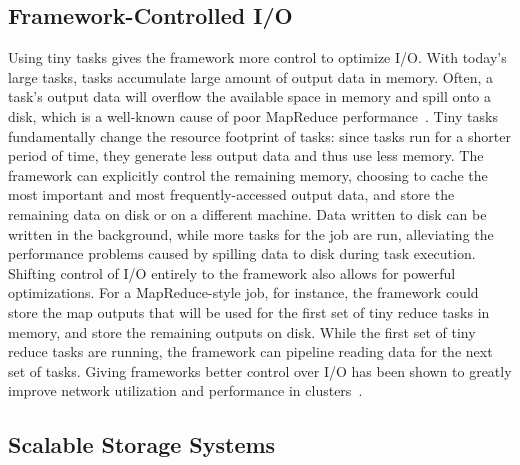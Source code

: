 \subsection{Framework-Controlled I/O}
\label{sec:pipeline}

Using tiny tasks gives the framework more control to optimize I/O.
With
today's large tasks, tasks accumulate large amount of output data in memory.
Often, a task's output data will overflow the available space in memory
and spill onto a disk, which is a well-known cause of poor MapReduce
performance~\cite{lipcon2012optimizing}. Tiny tasks fundamentally change the
resource footprint of tasks: since tasks run for a shorter period of time,
they generate less output data and thus use less memory. The framework can
explicitly control the remaining memory, choosing to cache the most important
and most frequently-accessed output data, and store the remaining data on disk
or on a different machine. Data written to disk can be written in the
background, while more tasks for the job are run, alleviating the performance
problems caused by spilling data to disk during task execution.
Shifting control of I/O entirely to the framework also allows for
powerful optimizations.  For a MapReduce-style job, for instance, the
framework could store the map outputs that will be used for the first set of
tiny reduce tasks in memory, and store the remaining outputs on disk. While
the first set of tiny reduce tasks are running, the framework can pipeline
reading data for the next set of tasks.  Giving frameworks better control over
I/O has been shown
to greatly improve network utilization and performance in
clusters~\cite{chowdhury2011managing, chowdhury2012coflow}.

\subsection{Scalable Storage Systems}

